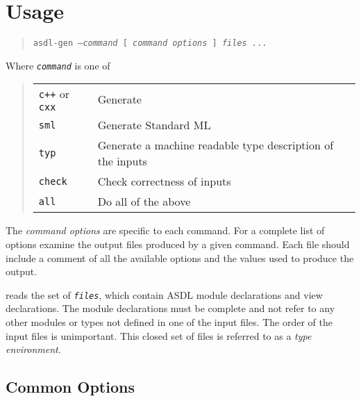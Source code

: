%
\chapter{Usage}
\label{chap:usage}

\begin{quote}
  \texttt{asdl-gen --\textit{command} [ \textit{command options} ] \textit{files} ...}
\end{quote}%

Where \texttt{\textit{command}} is one of
\begin{quote}
  \begin{tabular}{ll}
    \texttt{c++} or \texttt{cxx}
      & Generate \Cplusplus{} \\
    \texttt{sml}
      & Generate Standard ML \\
    \texttt{typ}
      & Generate a machine readable type description of the inputs \\
    \texttt{check}
      & Check correctness of inputs \\
    \texttt{all}
      & Do all of the above \\	
  \end{tabular}
\end{quote}%

The \textit{command options} are specific to each command.
For a complete list of options examine the output files produced by a given command.
Each file should include a comment of all the available options and
the values used to produce the output. 

\asdlgen{} reads the set of \texttt{\textit{files}}, which contain ASDL module
declarations and view declarations. The module declarations must be
complete and not refer to any other modules or types not defined in
one of the input files. The order of the input files is
unimportant. This closed set of files is referred to as a \emph{type environment}.

\section{Common Options}

